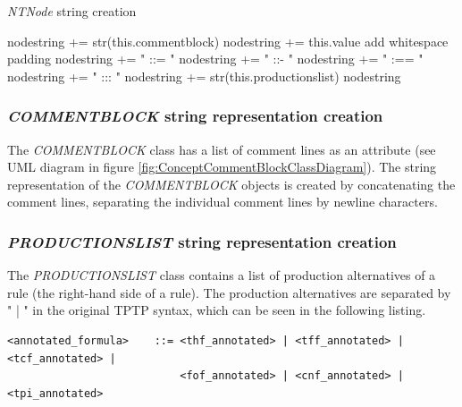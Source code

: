 \begin{algorithm}[H]
\caption{\textit{NTNode} string creation}\label{alg:OutputCreateNodeString}
\begin{algorithmic}[1] 
	\State node\textunderscore string += str(this.comment\textunderscore block)
\EndIf
\State node\textunderscore string += this.value
\State add whitespace padding
	\State node\textunderscore string += " ::= "
	\State node\textunderscore string += " ::- "
	\State node\textunderscore string += " :== "
	\State node\textunderscore string += " ::: "
\EndIf
\State node\textunderscore string += str(this.productions\textunderscore list)
\Return node\textunderscore string
\end{algorithmic}
\end{algorithm}

\subsubsection{\textit{COMMENT\textunderscore BLOCK} string representation creation}

The \textit{COMMENT\textunderscore BLOCK} class has a list of comment lines as an attribute (see UML diagram in figure \ref{fig:ConceptCommentBlockClassDiagram}). The string representation of the \textit{COMMENT\textunderscore BLOCK} objects is created by concatenating the comment lines, separating the individual comment lines by newline characters.

\subsubsection{\textit{PRODUCTIONS\textunderscore LIST} string representation creation}

The \textit{PRODUCTIONS\textunderscore LIST} class contains a list of production alternatives of a rule (the right-hand side of a rule). The production alternatives are separated by " | " in the original \ac{TPTP} syntax, which can be seen in the following listing.

\begin{lstlisting}[language=none, basicstyle=\scriptsize, caption=Production alternatives in the TPTP syntax, label= lst:ConceptOutputProductionsListProductionsAlternatives]
<annotated_formula>    ::= <thf_annotated> | <tff_annotated> | <tcf_annotated> |
                           <fof_annotated> | <cnf_annotated> | <tpi_annotated>
\end{lstlisting}

